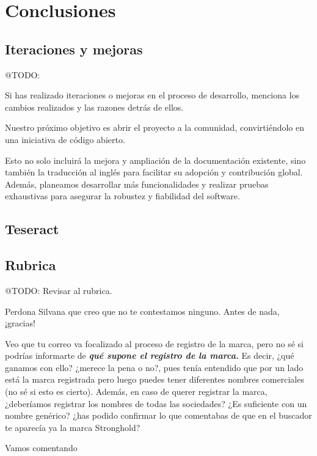 \chapter{Conclusiones}\label{ch:chapter_6}




\section{Iteraciones y mejoras}
\colorbox{color_highlight}{@TODO:}

Si has realizado iteraciones o mejoras en el proceso de desarrollo, menciona los cambios realizados y las razones detrás
de ellos.

Nuestro próximo objetivo es abrir el proyecto a la comunidad, convirtiéndolo en una iniciativa de código abierto.

Esto no solo incluirá la mejora y ampliación de la documentación existente, sino también la traducción al inglés para
facilitar su adopción y contribución global.
Además, planeamos desarrollar más funcionalidades y realizar pruebas exhaustivas para asegurar la robustez y fiabilidad
del software.


\section{Teseract}


\section{Rubrica}
\colorbox{color_highlight}{@TODO:}
Revisar al rubrica.

Perdona Silvana que creo que no te contestamos ninguno. Antes de nada, ¡gracias!



Veo que tu correo va focalizado al proceso de registro de la marca, pero no sé si podrías informarte de
\textbf{\textit{qué supone el registro de la marca.}}
Es decir, ¿qué ganamos con ello? ¿merece la pena o no?, pues tenía entendido que por un lado está la marca registrada
pero luego puedes tener diferentes nombres comerciales (no sé si esto es cierto). Además, en caso de querer registrar la
marca, ¿deberíamos registrar los nombres de todas las sociedades? ¿Es suficiente con un nombre genérico? ¿has podido
confirmar lo que comentabas de que en el buscador te aparecía ya la marca Stronghold?


Vamos comentando


